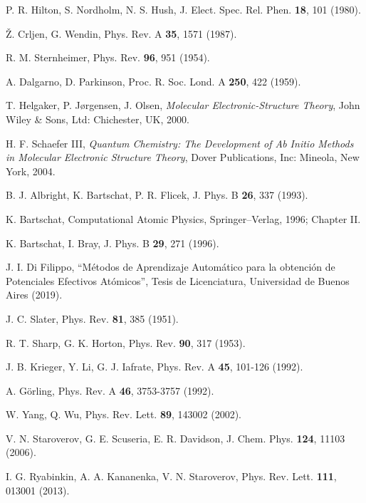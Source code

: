 \begin{thebibliography}{9}
P. R. Hilton, S. Nordholm, N. S. Hush, 
J. Elect. Spec. Rel. Phen. \textbf{18}, 101 (1980).

{\v Z}. Crljen, G. Wendin,
Phys. Rev. A \textbf{35}, 1571 (1987).

R. M. Sternheimer, 
Phys. Rev. \textbf{96}, 951 (1954).

A. Dalgarno, D. Parkinson,
Proc. R. Soc. Lond. A \textbf{250}, 422 (1959).

T. Helgaker, P. J{\o}rgensen, J. Olsen,
\textit{Molecular Electronic-Structure Theory},
John Wiley {\&} Sons, Ltd: Chichester, UK, 2000.

H. F. Schaefer III,
\textit{Quantum Chemistry: The Development of Ab Initio Methods in
Molecular Electronic Structure Theory},
Dover Publications, Inc: Mineola, New York, 2004.

B. J. Albright, K. Bartschat, P. R. Flicek,
J. Phys. B \textbf{26}, 337 (1993).

K. Bartschat, 
Computational Atomic Physics,
Springer--Verlag, 1996; Chapter II.

K. Bartschat, I. Bray, 
J. Phys. B \textbf{29}, 271 (1996).

J. I. Di Filippo,
``Métodos de Aprendizaje Automático para la obtención de Potenciales 
Efectivos Atómicos'', Tesis de Licenciatura, Universidad de Buenos Aires
(2019).



J. C. Slater, 
Phys. Rev. \textbf{81}, 385 (1951).

R. T. Sharp, G. K. Horton,
Phys. Rev. \textbf{90}, 317 (1953).

J. B. Krieger, Y. Li, G. J. Iafrate, 
Phys. Rev. A \textbf{45}, 101-126 (1992).

A. G\"orling,
Phys. Rev. A \textbf{46}, 3753-3757 (1992).

W. Yang, Q. Wu,
Phys. Rev. Lett. \textbf{89}, 143002 (2002).

V. N. Staroverov, G. E. Scuseria, E. R. Davidson,
J. Chem. Phys. \textbf{124}, 11103 (2006).

I. G. Ryabinkin, A. A. Kananenka, V. N. Staroverov,
Phys. Rev. Lett. \textbf{111}, 013001 (2013).


\end{thebibliography}
